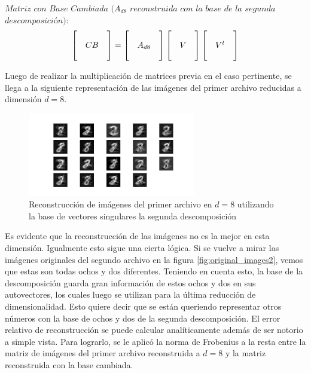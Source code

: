 \documentclass[12pt,a4]{article} %
\begin{document}
$Matriz$ $con$ $Base$ $Cambiada$ $(A_{d8}$ $reconstruida$ $con$ $la$ $base$ $de$ $la$ $segunda$ $descomposición):$
\begin{equation}
    \centering
    \begin{bmatrix}
            &   &   \\
            &CB &   \\
            &   &   
    \end{bmatrix} = \begin{bmatrix}
            &   &   \\
            &A_{d8}&    \\
            &   &   
    \end{bmatrix}\begin{bmatrix}
            &   &   \\
            & V &   \\
            &   &   
    \end{bmatrix}\begin{bmatrix}
            &   &   \\
            &V^{t}& \\
            &   &
    \end{bmatrix}
\end{equation}

Luego de realizar la multiplicación de matrices previa en el caso pertinente, se llega a la siguiente representación de las imágenes del primer archivo reducidas a dimensión $d = 8$.

\begin{figure}[H]
    \centering
    \includegraphics[width=0.65\textwidth]{latex_project/Graficos_ej2/compression_8.jpeg}
    \caption{Reconstrucción de imágenes del primer archivo en $d = 8$ utilizando la base de vectores singulares la segunda descomposición}
    \label{fig:d8}
\end{figure}

Es evidente que la reconstrucción de las imágenes no es la mejor en esta dimensión. Igualmente esto sigue una cierta lógica. Si se vuelve a mirar las imágenes originales del segundo archivo en la figura \ref{fig:original_images2}, vemos que estas son todas ochos y dos diferentes. Teniendo en cuenta esto, la base de la descomposición guarda gran información de estos ochos y dos en sus autovectores, los cuales luego se utilizan para la última reducción de dimensionalidad. Esto quiere decir que se están queriendo representar otros números con la base de ochos y dos de la segunda descomposición. El error relativo de reconstrucción se puede calcular analíticamente además de ser notorio a simple vista. Para lograrlo, se le aplicó la norma de Frobenius a la resta entre la matriz de imágenes del primer archivo reconstruida a $d = 8$ y la matriz reconstruida con la base cambiada.
\end{document}

